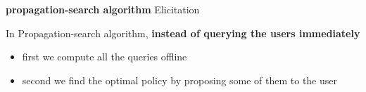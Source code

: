 \documentclass{beamer}
\newcommand\Fontvi{\fontsize{9}{10.2}\selectfont}
\begin{document}
\begin{frame}
\begin{center}
	\textbf{propagation-search algorithm}
	\alert{Elicitation}
\end{center}
\end{frame}

\Fontvi
\begin{frame}
In Propagation-search algorithm, \textbf{instead of querying the users immediately}
\begin{itemize}
\item first we compute all the queries offline
\item second we find the optimal policy by proposing some of them to the user 
\end{itemize}
  

\end{frame}
\end{document}
